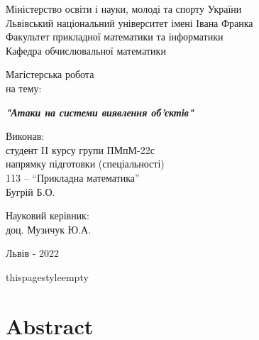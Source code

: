 \documentclass[14pt,a4paper]{extarticle}
\newcounter{e}
\newcounter{tabl}
\numberwithin{equation}{section}
\numberwithin{figure}{section}
\begin{document}
	

 \thispagestyle{empty}

 \begin{center}
	\large
	Міністерство освіти і науки, молоді та спорту України \\
	Львівський національний університет імені Івана Франка \\
	Факультет прикладної математики та інформатики \\
	Кафедра обчислювальної математики
 \end{center}

 \vspace{45pt}

 \vfill

 \begin{center}
	{\Huge{Магістерська робота}}\\
	{\large на тему:}
 \end{center}

 \begin{center}\Large
	\textbf{\emph{"Атаки на системи виявлення об'єктів"}}
 \end{center}

 \vfill
 \vskip100pt

 \begin{flushleft}
	\hskip8cm 
	Виконав:
	\\ \hskip8cm 
	студент II курсу групи ПМпМ-22с
	\\ \hskip8cm
	напрямку підготовки (спеціальності)
	\\ \hskip8cm
	113 -- ``Прикладна математика''
	\\ \hskip8cm
	Бугрій Б.О.
 \end{flushleft}

 \begin{flushleft}
	\hskip8cm 
	Науковий керівник:
	\\ \hskip8cm
	доц. Музичук Ю.А.
 \end{flushleft}

 \vfill

 \begin{center}
	\large
	Львів - 2022
 \end{center}

 \newpage
 \thispagestyle{empty}
 \renewcommand*\contentsname{Contents}
 \tableofcontents

\newpage
thispagestyle{empty}
\section*{Abstract}
\begin{center}\end{center}
\end{document}
